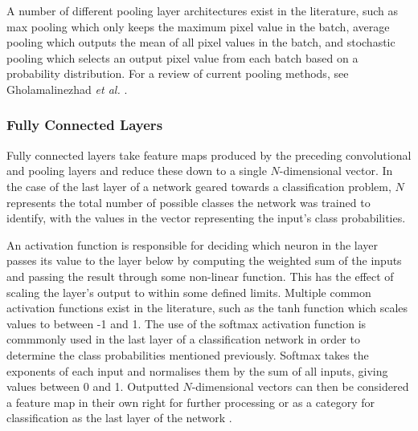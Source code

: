 A number of different pooling layer architectures exist in the literature, such as max pooling which only keeps the maximum pixel value in the batch, average pooling \cite{boureau_theoretical_2010} which outputs the mean of all pixel values in the batch, and stochastic pooling \cite{zeiler_stochastic_2013} which selects an output pixel value from each batch based on a probability distribution. For a review of current pooling methods, see Gholamalinezhad \textit{et al.} \cite{gholamalinezhad_pooling_2020}.

\subsubsection{Fully Connected Layers}\label{ch:Background,sec:CNN,sub:CNN,subsubsec:fullyConnected}

Fully connected layers take feature maps produced by the preceding convolutional and pooling layers and reduce these down to a single $N$-dimensional vector. In the case of the last layer of a network geared towards a classification problem, $N$ represents the total number of possible classes the network was trained to identify, with the values in the vector representing the input's class probabilities.

An activation function is responsible for deciding which neuron in the layer passes its value to the layer below by computing the weighted sum of the inputs and passing the result through some non-linear function. This has the effect of scaling the layer's output to within some defined limits. Multiple common activation functions exist in the literature, such as the tanh function which scales values to between -1 and 1. The use of the softmax activation function is commmonly used in the last layer of a classification network in order to determine the class probabilities mentioned previously. Softmax takes the exponents of each input and normalises them by the sum of all inputs, giving values between 0 and 1. Outputted $N$-dimensional vectors can then be considered a feature map in their own right for further processing \cite{krizhevsky_imagenet_2012} or as a category for classification as the last layer of the network \cite{girshick_rich_2014}.


